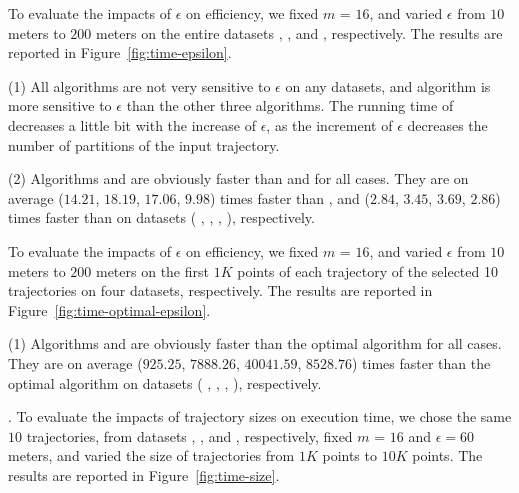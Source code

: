 To evaluate the impacts of $\epsilon$ on efficiency, we fixed $m$ = $16$,
and varied $\epsilon$  from $10$ meters to $200$ meters on the entire
datasets \sercar, \geolife, \mopsi and \pricar, respectively.
The results are reported in Figure~\ref{fig:time-epsilon}.

\ni(1) All algorithms are not very sensitive to $\epsilon$ on any datasets, and algorithm \dps is more sensitive to $\epsilon$ than the other three algorithms.
The running time of \dps decreases a little bit with the increase of $\epsilon$, as the increment of $\epsilon$ decreases the number of partitions of the input trajectory.


\ni(2) Algorithms \cist and \cista are obviously faster than \dps and \squishe for all cases.
They are on average ($14.21$, $18.19$, $17.06$, $9.98$) times faster than \dps,
and ($2.84$, $3.45$, $3.69$, $2.86$) times faster than \squishe on
{datasets} ( \sercar, {\geolife}, \mopsi, \pricar), respectively.

To evaluate the impacts of $\epsilon$ on efficiency, we fixed $m$ = $16$,
and varied $\epsilon$ from $10$ meters to $200$ meters on the first $1K$ points of each trajectory of the selected 10 trajectories on four datasets, respectively.
The results are reported in Figure~\ref{fig:time-optimal-epsilon}.

\ni(1) Algorithms \cist and \cista are obviously faster than the optimal algorithm for all cases.
They are on average ($925.25$, $7888.26$, $40041.59$, $8528.76$) times faster than the optimal algorithm on
{datasets} ( \sercar, {\geolife}, \mopsi, \pricar), respectively.

.
To evaluate the impacts of trajectory sizes on execution time,
we chose the same {$10$} trajectories, from {datasets} \sercar, \geolife, \mopsi and \pricar, respectively,
fixed $m$ = $16$ and $\epsilon = 60$ meters, and varied the size  of trajectories from $1K$ points to $10K$ points.
%
The results are reported in Figure~\ref{fig:time-size}.

